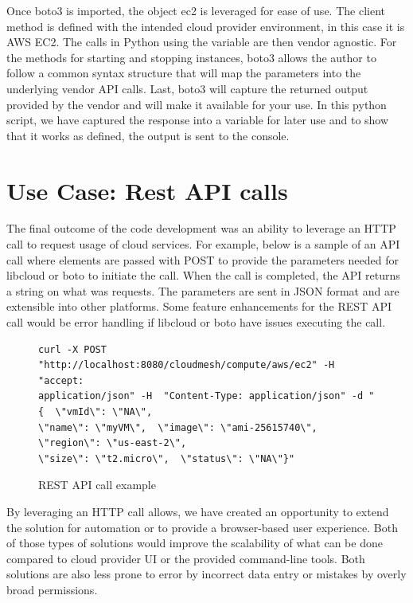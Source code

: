 Once boto3 is imported, the object ec2 is leveraged for ease of use. The client
method is defined with the intended cloud provider environment, in this case it
is AWS EC2. The calls in Python using the variable are then vendor agnostic. For
the methods for starting and stopping instances, boto3 allows the author to
follow a common syntax structure that will map the parameters into the
underlying vendor API calls. Last, boto3 will capture the returned output
provided by the vendor and will make it available for your use. In this python
script, we have captured the response into a variable for later use and to show
that it works as defined, the output is sent to the console.

\section{Use Case: Rest API calls}

The final outcome of the code development was an ability to leverage an HTTP
call to request usage of cloud services. For example, below is a sample of an
API call where elements are passed with POST to provide the parameters needed
for libcloud or boto to initiate the call. When the call is completed, the API
returns a string on what was requests. The parameters are sent in JSON format
and are extensible into other platforms. Some feature enhancements for the REST
API call would be error handling if libcloud or boto have issues executing the
call.  

\begin{figure}[htb]
\begin{verbatim}
curl -X POST "http://localhost:8080/cloudmesh/compute/aws/ec2" -H  "accept:
application/json" -H  "Content-Type: application/json" -d "{  \"vmId\": \"NA\", 
\"name\": \"myVM\",  \"image\": \"ami-25615740\",  \"region\": \"us-east-2\", 
\"size\": \"t2.micro\",  \"status\": \"NA\"}"
\end{verbatim}

\caption{REST API call example}\label{c:REST-example}
\end{figure}

By leveraging an HTTP call allows, we have created an opportunity to extend the
solution for automation or to provide a browser-based user experience. Both of
those types of solutions would improve the scalability of what can be done
compared to cloud provider UI or the provided command-line tools. Both solutions
are also less prone to error by incorrect data entry or mistakes by overly broad
permissions. 

